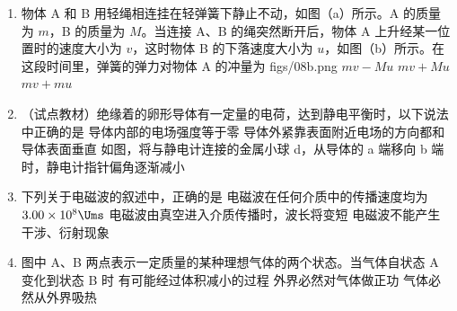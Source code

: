 \documentclass[\gkver]{gaokaozhenti}
\begin{document}
\begin{enumerate}
\item
物体 A 和 B 用轻绳相连挂在轻弹簧下静止不动，如图（a）所示。A 的质量为 $m$，B 的质量为 $M$。当连接 A、B 的绳突然断开后，物体 A 上升经某一位置时的速度大小为 $v$，这时物体 B 的下落速度大小为 $u$，如图（b）所示。在这段时间里，弹簧的弹力对物体 A 的冲量为
{figs/08b.png}
{$mv - Mu$}
{$mv + Mu$}
{$mv + mu$}

\item
（试点教材）绝缘着的卵形导体有一定量的电荷，达到静电平衡时，以下说法中正确的是
\onepicture[w=5cm]{}
{导体内部的电场强度等于零}
{导体外紧靠表面附近电场的方向都和导体表面垂直}
{如图，将与静电计连接的金属小球 d，从导体的 a 端移向 b 端时，静电计指针偏角逐渐减小}

\item
下列关于电磁波的叙述中，正确的是
{电磁波在任何介质中的传播速度均为 $3.00\times10^{8}\Ums$}
{电磁波由真空进入介质传播时，波长将变短}
{电磁波不能产生干涉、衍射现象}

\item
图中 A、B 两点表示一定质量的某种理想气体的两个状态。当气体自状态 A 变化到状态 B 时
\onepicture[w=4cm]{}
{有可能经过体积减小的过程}
{外界必然对气体做正功}
{气体必然从外界吸热}


\end{enumerate}
\end{document}
